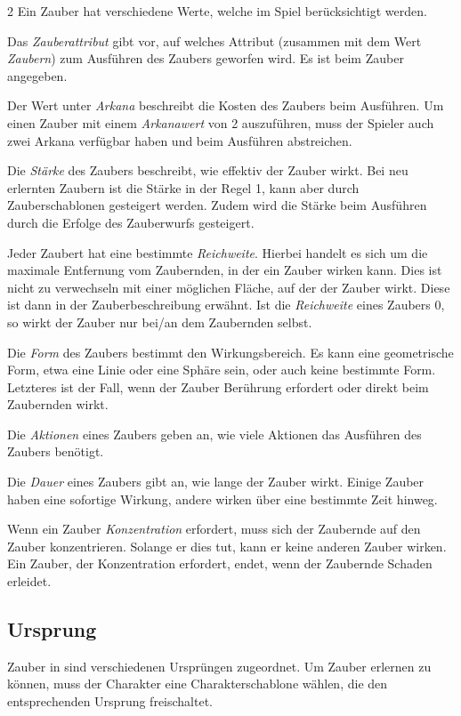 \begin{multicols}{2}
Ein Zauber hat verschiedene Werte, welche im Spiel berücksichtigt werden.

Das \textit{Zauberattribut} gibt vor, auf welches Attribut (zusammen mit dem Wert \textit{Zaubern}) zum Ausführen des Zaubers geworfen wird. Es ist beim Zauber angegeben.

Der Wert unter \textit{Arkana} beschreibt die Kosten des Zaubers beim Ausführen. Um einen Zauber mit einem \textit{Arkanawert} von 2 auszuführen, muss der Spieler auch zwei Arkana verfügbar haben und beim Ausführen abstreichen.

Die \textit{Stärke} des Zaubers beschreibt, wie effektiv der Zauber wirkt. Bei neu erlernten Zaubern ist die Stärke in der Regel 1, kann aber durch Zauberschablonen gesteigert werden. Zudem wird die Stärke beim Ausführen durch die Erfolge des Zauberwurfs gesteigert.

Jeder Zaubert hat eine bestimmte \textit{Reichweite}. Hierbei handelt es sich um die maximale Entfernung vom Zaubernden, in der ein Zauber wirken kann. Dies ist nicht zu verwechseln mit einer möglichen Fläche, auf der der Zauber wirkt. Diese ist dann in der Zauberbeschreibung erwähnt. Ist die \textit{Reichweite} eines Zaubers 0, so wirkt der Zauber nur bei/an dem Zaubernden selbst.

Die \textit{Form} des Zaubers bestimmt den Wirkungsbereich. Es kann eine geometrische Form, etwa eine Linie oder eine Sphäre sein, oder auch keine bestimmte Form. Letzteres ist der Fall, wenn der Zauber Berührung erfordert oder direkt beim Zaubernden wirkt.

Die \textit{Aktionen} eines Zaubers geben an, wie viele Aktionen das Ausführen des Zaubers benötigt.

Die \textit{Dauer} eines Zaubers gibt an, wie lange der Zauber wirkt. Einige Zauber haben eine sofortige Wirkung, andere wirken über eine bestimmte Zeit hinweg.

Wenn ein Zauber \textit{Konzentration} erfordert, muss sich der Zaubernde auf den Zauber konzentrieren. Solange er dies tut, kann er keine anderen Zauber wirken. Ein Zauber, der Konzentration erfordert, endet, wenn der Zaubernde Schaden erleidet.

\subsection{Ursprung}

Zauber in  sind verschiedenen Ursprüngen zugeordnet. Um Zauber erlernen zu können, muss der Charakter eine Charakterschablone wählen, die den entsprechenden Ursprung freischaltet.


\end{multicols}

